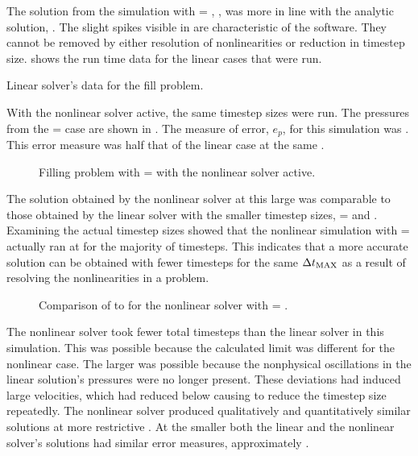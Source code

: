 The solution from the simulation with \dtmax{} = , , was more in line with the analytic solution, .
The slight spikes visible in  are characteristic of the \cobra{} software.
They cannot be removed by either resolution of nonlinearities or reduction in timestep size.
 shows the run time data for the linear cases that were run.

\begin{table}[h!tb]
\centering
\singlespace

\caption{Linear solver's data for the fill problem.}
\label{tab:vmpLinRunTime}
\end{table}

With the nonlinear solver active, the same timestep sizes were run.
The pressures from the \dtmax{} =  case are shown in .
The measure of error, $e_{p}$, for this simulation was .
This error measure was half that of the linear case at the same \dtmax{}.

\begin{figure}[h!tb]
\centering

\caption{Filling problem with \dtmax{} =  with the nonlinear solver active.}
\label{fig:nlnFill1em1}
\end{figure}

The solution obtained by the nonlinear solver at this large \dtmax{} was comparable to those obtained by the linear solver with the smaller timestep sizes, \dtmax{} =  and .
Examining the actual timestep sizes showed that the nonlinear simulation with \dtmax{} =  actually ran at \dtmax{} for the majority of timesteps.
This indicates that a more accurate solution can be obtained with fewer timesteps for the same $\dtmax{}$ as a result of resolving the nonlinearities in a problem. 

\begin{figure}[h!tb]
\centering

\caption{Comparison of \dt{} to \dtcrnt{} for the nonlinear solver with \dtmax{} = .}
\label{fig:vmpDeltaTNln1em1}
\end{figure}

The nonlinear solver took fewer total timesteps than the linear solver in this simulation.
This was possible because the calculated \dtcrnt{} limit was different for the nonlinear case.
The larger \dtcrnt{} was possible because the nonphysical oscillations in the linear solution's pressures were no longer present.
These deviations had induced large velocities, which had reduced \dtcrnt{} below \dtmax{} causing \cobra{} to reduce the timestep size repeatedly.
The nonlinear solver produced qualitatively and quantitatively similar solutions at more restrictive \dtmax{}.
At the smaller \dtmax{} both the linear and the nonlinear solver's solutions had similar error measures, approximately .

